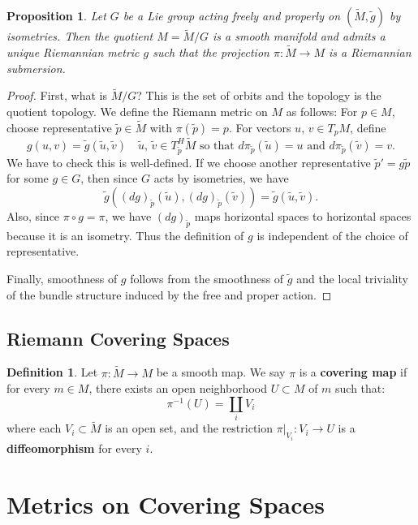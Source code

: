 \documentclass[11pt, a4paper]{article}
\theoremstyle{plain}
\newtheorem{proposition}[theorem]{Proposition}
\theoremstyle{definition}
\newtheorem{definition}[theorem]{Definition}
\theoremstyle{remark}
\begin{document}
\begin{proposition}
Let $G$ be a Lie group acting freely and properly on $(\tilde{M}, \tilde{g})$ by isometries. Then the quotient $M = \tilde{M}/G$ is a smooth manifold and admits a unique Riemannian metric $g$ such that the projection $\pi: \tilde{M} \to M$ is a Riemannian submersion.
\end{proposition}

\begin{proof}
    First, what is $\tilde{M}/G$? This is the set of orbits and the topology is the quotient topology. We define the Riemann metric on
    $M$ as follows: For $p \in M$, choose representative $\tilde{p} \in \tilde{M}$ with $\pi(\tilde{p}) = p$. For vectors $u,\,v \in T_p M$, define
    \[ g(u, v) = \tilde{g}(\tilde{u}, \tilde{v})\quad \tilde{u},\,\tilde{v} \in T_{\tilde{p}}^H \tilde{M}\text{ so that } d\pi_{\tilde{p}}(\tilde{u}) = u \text{ and } d\pi_{\tilde{p}}(\tilde{v}) = v. \]
    We have to check this is well-defined. If we choose another representative $\tilde{p}' = g\tilde{p}$ for some $g \in G$, then since $G$ acts by isometries, we have 
    \[ \tilde{g}((dg)_{\tilde{p}}(\tilde{u}), (dg)_{\tilde{p}}(\tilde{v})) = \tilde{g}(\tilde{u}, \tilde{v}). \]
    Also, since $\pi \circ g = \pi$, we have $(dg)_{\tilde{p}}$ maps horizontal spaces to horizontal spaces because it is an isometry. Thus the definition of $g$ is independent of the choice of representative.

    Finally, smoothness of $g$ follows from the smoothness of $\tilde{g}$ and the local triviality of the bundle structure induced by the free and proper action.
\end{proof}

\subsection{Riemann Covering Spaces}

\begin{definition}
Let $\pi: \tilde{M} \to M$ be a smooth map. We say $\pi$ is a \textbf{covering map} if for every $m \in M$, there exists an open neighborhood $U \subset M$ of $m$ such that:
\[
\pi^{-1}(U) = \coprod_{i} V_i
\]
where each $V_i \subset \tilde{M}$ is an open set, and the restriction $\pi|_{V_i}: V_i \to U$ is a \textbf{diffeomorphism} for every $i$.
\end{definition}

\section*{Metrics on Covering Spaces}
\end{document}

